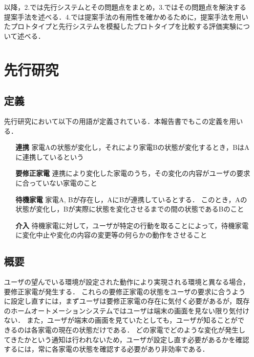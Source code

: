 \documentclass[a4j,12pt,twoside]{jreport}
\begin{document}
以降，2.では先行システムとその問題点をまとめ，3.ではその問題点を解決する提案手法を述べる．4.では提案手法の有用性を確かめるために，提案手法を用いたプロトタイプと先行システムを模擬したプロトタイプを比較する評価実験について述べる．

\chapter{先行研究}

\section{定義}
先行研究において以下の用語が定義されている．本報告書でもこの定義を用いる．
\begin{itemize}
\setlength{\leftskip}{1.72cm}
	\item [{\bf 連携}　　　]家電Aの状態が変化し，それにより家電Bの状態が変化するとき，BはAに連携しているという
	\item[{\bf 要修正家電}]連携により変化した家電のうち，その変化の内容がユーザの要求に合っていない家電のこと
	\item[{\bf 待機家電}　]家電A, Bが存在し，AにBが連携しているとする．
このとき，Aの状態が変化し，Bが実際に状態を変化させるまでの間の状態であるBのこと
	\item[{\bf 介入}　　　]待機家電に対して，ユーザが特定の行動を取ることによって，待機家電に変化中止や変化の内容の変更等の何らかの動作をさせること
\end{itemize}

\section{概要}
ユーザの望んでいる環境が設定された動作により実現される環境と異なる場合，要修正家電が発生する．
これらの要修正家電の状態をユーザの要求に合うように設定し直すには，まずユーザは要修正家電の存在に気付く必要があるが，既存のホームオートメーションシステムではユーザは端末の画面を見ない限り気付けない．
また，ユーザが端末の画面を見ていたとしても，ユーザが知ることができるのは各家電の現在の状態だけである．
どの家電でどのような変化が発生してきたかという通知は行われないため，ユーザが設定し直す必要があるかを確認するには，常に各家電の状態を確認する必要があり非効率である．
\end{document}
